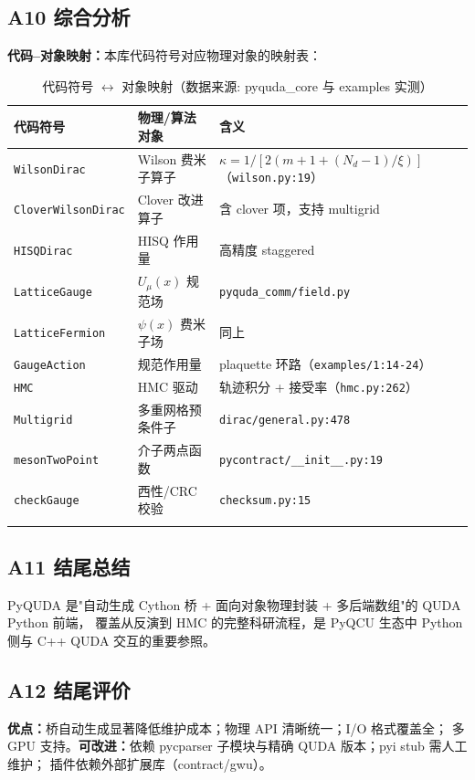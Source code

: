 \documentclass[UTF8]{ctexart}
\begin{document}
\subsection{A10 综合分析}
\textbf{代码--对象映射：}本库代码符号对应物理对象的映射表：
\begin{xltabular}{\textwidth}{lXX}
\toprule
\textcolor{struct}{代码符号} & 物理/算法对象 & 含义 \\
\midrule
\endhead
\texttt{WilsonDirac} & Wilson 费米子算子 & $\kappa=1/[2(m+1+(N_d-1)/\xi)]$（\texttt{wilson.py:19}）\\
\texttt{CloverWilsonDirac} & Clover 改进算子 & 含 clover 项，支持 multigrid \\
\texttt{HISQDirac} & HISQ 作用量 & 高精度 staggered \\
\texttt{LatticeGauge} & $U_\mu(x)$ 规范场 & \texttt{pyquda\_comm/field.py} \\
\texttt{LatticeFermion} & $\psi(x)$ 费米子场 & 同上 \\
\texttt{GaugeAction} & 规范作用量 & plaquette 环路（\texttt{examples/1:14-24}）\\
\texttt{HMC} & HMC 驱动 & 轨迹积分 + 接受率（\texttt{hmc.py:262}）\\
\texttt{Multigrid} & 多重网格预条件子 & \texttt{dirac/general.py:478} \\
\texttt{mesonTwoPoint} & 介子两点函数 & \texttt{pycontract/__init__.py:19} \\
\texttt{checkGauge} & 西性/CRC 校验 & \texttt{checksum.py:15} \\
\bottomrule
\caption{代码符号 $\leftrightarrow$ 对象映射（数据来源: pyquda_core 与 examples 实测）}
\end{xltabular}

\subsection{A11 结尾总结}
\begin{conclbox}
PyQUDA 是"自动生成 Cython 桥 + 面向对象物理封装 + 多后端数组"的 QUDA Python 前端，
覆盖从反演到 HMC 的完整科研流程，是 PyQCU 生态中 Python 侧与 C++ QUDA 交互的重要参照。
\end{conclbox}

\subsection{A12 结尾评价}
\textbf{优点：}桥自动生成显著降低维护成本；物理 API 清晰统一；I/O 格式覆盖全；
多 GPU 支持。\textbf{可改进：}依赖 pycparser 子模块与精确 QUDA 版本；pyi stub 需人工维护；
插件依赖外部扩展库（contract/gwu）。
\end{document}
